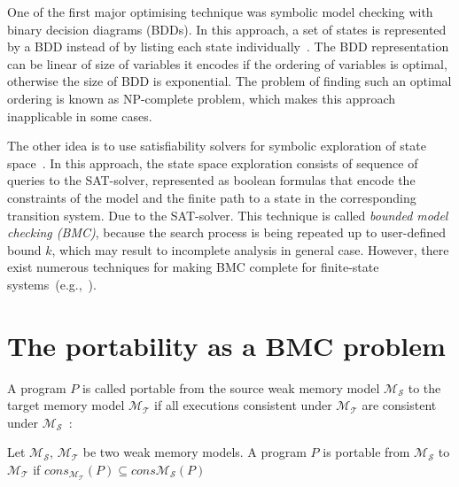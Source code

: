 One of the first major optimising technique was symbolic model checking with binary decision diagrams (BDDs). In this approach, a set of states is represented by a BDD instead of by listing each state individually~\cite{clarke2012model}.
The BDD representation can be linear of size of variables it encodes if the ordering of variables is optimal, otherwise the size of BDD is exponential. The problem of finding such an optimal ordering is known as NP-complete problem, which makes this approach inapplicable in some cases.

The other idea is to use satisfiability solvers for symbolic exploration of state space~\cite{clarke2001bounded}. In this approach, the state space exploration consists of sequence of queries to the SAT-solver, represented as boolean formulas that encode the constraints of the model and the finite path to a state in the corresponding transition system.  
Due to the SAT-solver. This technique is called \textit{bounded model checking (BMC)}, because the search process is being repeated up to user-defined bound $k$, which may result to incomplete analysis in general case. However, there exist numerous techniques for making BMC complete for finite-state systems~(e.g.,~\cite{shtrichman2000tuning}).


\section{The portability as a BMC problem}
\label{ch:port:enc}

A program $P$ is called portable from the source weak memory model $\mathcal{M_S}$ to the target memory model $\mathcal{M_T}$ if all executions consistent under $\mathcal{M_T}$ are consistent under $\mathcal{M_S}$~\cite{Porthos17}:

\begin{definition}[Portability]
Let $\mathcal{M_S}$, $\mathcal{M_T}$ be two weak memory models. A program $P$ is portable from $\mathcal{M_S}$ to $\mathcal{M_T}$ if 
$cons_{\mathcal{M_T}}(P) \subseteq cons{\mathcal{M_S}}(P)$
\end{definition}

